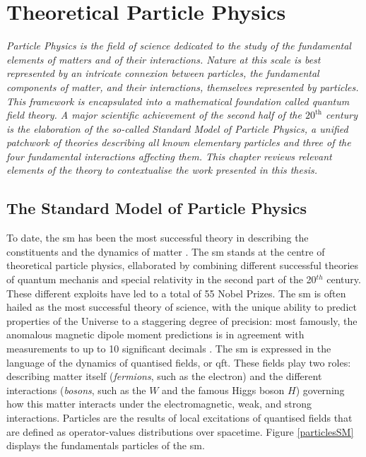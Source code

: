 \chapter{\color{oxfordblue} Theoretical Particle Physics}\label{chap-theory}
\textit{Particle Physics is the field of science dedicated to the study of the fundamental elements of matters and of their interactions. Nature at this scale is best represented by an intricate connexion between particles, the fundamental components of matter, and their interactions, themselves represented by particles. This framework is encapsulated into a mathematical foundation called quantum field theory. A major scientific achievement of the second half of the $20^{\text{th}}$ century is the elaboration of the so-called Standard Model of Particle Physics, a unified patchwork of theories describing all known elementary particles and three of the four fundamental interactions affecting them. This chapter reviews relevant elements of the theory to contextualise the work presented in this thesis.}

\section{The Standard Model of Particle Physics}\label{Section:SM}
To date, the \gls{sm} has been the most successful theory in describing the constituents and the dynamics of matter \cite{SMphysics}. The \gls{sm} stands at the centre of theoretical particle physics, ellaborated by combining different successful theories of quantum mechanis and special relativity in the second part of the 20$^{th}$ century. These different exploits have led to a total of 55 Nobel Prizes. The \gls{sm} is often hailed as the most successful theory of science, with the unique ability to predict properties of the Universe to a staggering degree of precision: most famously, the anomalous magnetic dipole moment predictions is in agreement with measurements to up to 10 significant decimals \cite{PhysRevA.83.052122}. The \gls{sm} is expressed in the language of the dynamics of quantised fields, or \gls{qft}. These fields play two roles: describing matter itself (\textit{fermions}, such as the electron) and the different interactions (\textit{bosons}, such as the $W$ and the famous Higgs boson $H$) governing how this matter interacts under the electromagnetic, weak, and strong interactions. Particles are the results of local excitations of quantised fields that are defined as operator-values distributions over spacetime. Figure \ref{particlesSM} displays the fundamentals particles of the \gls{sm}. \\

